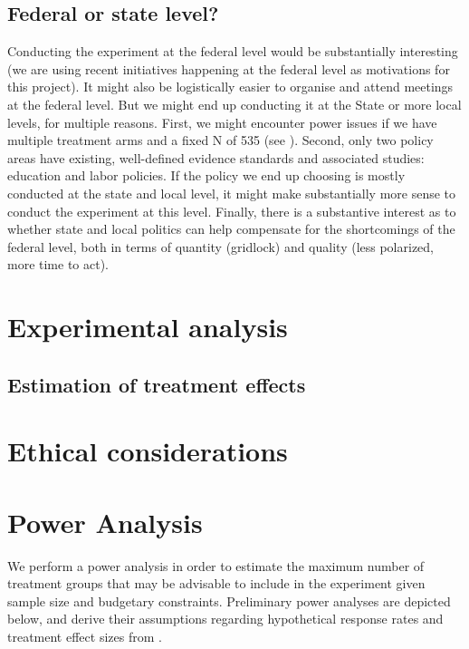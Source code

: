\documentclass[12pt,final,fleqn]{article}
\theoremstyle{plain}
\begin{document}
\subsection{Federal or state level?} \label{sec: Level}

Conducting the experiment at the federal level would be substantially interesting (we are using recent initiatives happening at the federal level as motivations for this project). It might also be logistically easier to organise and attend meetings at the federal level. But we might end up conducting it at the State or more local levels, for multiple reasons. First, we might encounter power issues if we have multiple treatment arms and a fixed N of 535 (see ). Second, only two policy areas have existing, well-defined evidence standards and associated studies: education and labor policies. If the policy we end up choosing is mostly conducted at the state and local level, it might make substantially more sense to conduct the experiment at this level. Finally, there is a substantive interest as to whether state and local politics can help compensate for the shortcomings of the federal level, both in terms of quantity (gridlock) and quality (less polarized, more time to act). 

\section{Experimental analysis} \label{sec:analysis}

\subsection{Estimation of treatment effects} \label{sec:treatment_effects}



\section{Ethical considerations} \label{sec:Ethics}



\section{Power Analysis} \label{sec:Power}

We perform a power analysis in order to estimate the maximum number of treatment groups that may be advisable to include in the experiment given sample size and budgetary constraints. Preliminary power analyses are depicted below, and derive their assumptions regarding hypothetical response rates and treatment effect sizes from \citet{kalla2016campaign}.
\end{document}
